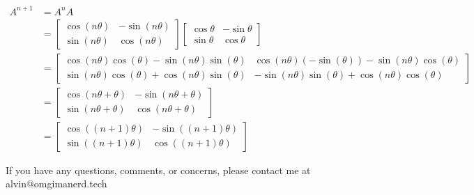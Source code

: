 \documentclass[letterpaper, 12pt]{math}
\begin{document}
\begin{align*}
  A^{n+1} &= A^nA \\
  &= \begin{bmatrix}
    \cos(n\theta) & -\sin(n\theta) \\
    \sin(n\theta) & \cos(n\theta)
  \end{bmatrix}\begin{bmatrix}
    \cos\theta & -\sin\theta \\
    \sin\theta & \cos\theta
  \end{bmatrix} \\
  &= \begin{bmatrix}
    \cos(n\theta)\cos(\theta)-\sin(n\theta)\sin(\theta) &
      \cos(n\theta)(-\sin(\theta))-\sin(n\theta)\cos(\theta) \\
    \sin(n\theta)\cos(\theta)+\cos(n\theta)\sin(\theta) &
      -\sin(n\theta)\sin(\theta)+\cos(n\theta)\cos(\theta)
  \end{bmatrix} \\
  &= \begin{bmatrix}
    \cos(n\theta+\theta) & -\sin(n\theta+\theta) \\
    \sin(n\theta+\theta) & \cos(n\theta+\theta)
  \end{bmatrix} \\
  &= \begin{bmatrix}
    \cos((n+1)\theta) & -\sin((n+1)\theta) \\
    \sin((n+1)\theta) & \cos((n+1)\theta)
  \end{bmatrix}
\end{align*}

\begin{center}
  If you have any questions, comments, or concerns, please contact me at
  alvin@omgimanerd.tech
\end{center}
\end{document}
